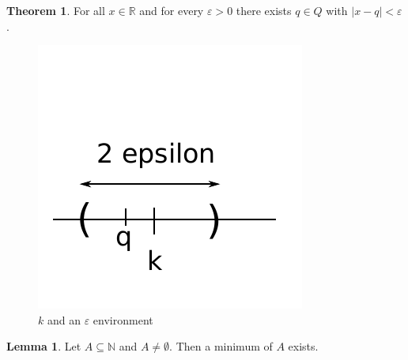 \documentclass[a4paper,landscape,twocolumn]{article}
\theoremstyle{definition}
\newtheorem{theorem}{Theorem}
\newtheorem{lemma}{Lemma}
\newcommand\abs[1]{\left|#1\right|}
\begin{document}
\begin{theorem}
  For all $x \in \mathbb R$ and for every $\varepsilon > 0$ there exists $q \in Q$
  with $\abs{x - q} < \varepsilon$.

  \begin{figure}[!h]
    \begin{center}
      \includegraphics{img/dense_q.pdf}
      \caption{$k$ and an $\varepsilon$ environment}
    \end{center}
  \end{figure}
\end{theorem}
\begin{lemma}
  Let $A \subseteq \mathbb N$ and $A \neq \emptyset$.
  Then a minimum of $A$ exists.
\end{lemma}
\end{document}
